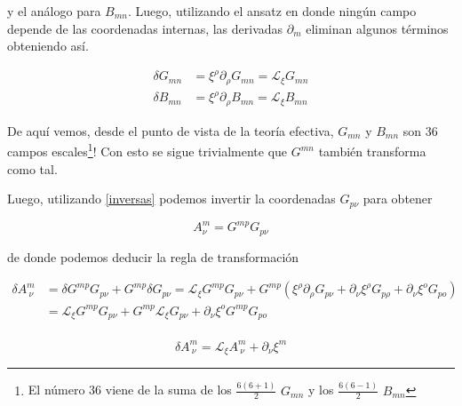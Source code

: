 \documentclass{article}
\numberwithin{equation}{section}
\begin{document}
y el análogo para $ B_{m n} $. Luego, utilizando el ansatz en donde ningún campo depende de las coordenadas internas, las derivadas $ \partial_m $ eliminan algunos términos obteniendo así.


\begin{boxquation}
\begin{equation}\label{GyBscalars}
\begin{aligned}
\delta G_{m n} &= \xi^{\rho} \partial_{\rho} G_{m n} = \mathcal{L}_{\xi} G_{m n}\\
\delta B_{m n} &= \xi^{\rho} \partial_{\rho} B_{m n} = \mathcal{L}_{\xi} B_{m n}
\end{aligned}
\end{equation}
\end{boxquation}


De aquí vemos, desde el punto de vista de la teoría efectiva, $ G_{m n} $ y $ B_{m n} $ son 36 campos escales\footnote{ El número 36 viene de la suma de los $ \frac{6(6+1)}{2} $ $ G_{m n} $ y los $ \frac{6(6-1)}{2} $ $ B_{m n} $}! Con esto se sigue trivialmente que $ G^{m n} $ también transforma como tal.

Luego, utilizando \ref{inversas} podemos invertir la coordenadas $ G_{p \nu} $ para obtener

\begin{equation}
A^m_{\nu} = G^{m p} G_{p \nu}
\end{equation}

de donde podemos deducir la regla de transformación 

\begin{equation*}
\begin{aligned}
\delta A^m_{\ \nu} &= \delta G^{m p} G_{p \nu} + G^{m p} \delta G_{p \nu} = \mathcal{L}_{\xi} G^{m p} G_{p \nu} + G^{m p} \left( \xi^{\rho} \partial_{\rho} G_{p \nu} + \partial_{\nu} \xi^{\rho} G_{p \rho} + \partial_{\nu} \xi^{o} G_{p o} \right)\\
&=\mathcal{L}_{\xi} G^{m p} G_{p \nu} + G^{m p} \mathcal{L}_{\xi} G_{p \nu} + \partial_{\nu} \xi^{o} G^{m p} G_{p o}\\
\end{aligned}
\end{equation*}

\begin{boxquation}
	\begin{equation}\label{A}
	\delta A^m_{\ \nu}= \mathcal{L}_{\xi} A^m_{\ \nu} + \partial_{\nu} \xi^m
	\end{equation}
\end{boxquation}
\end{document}
